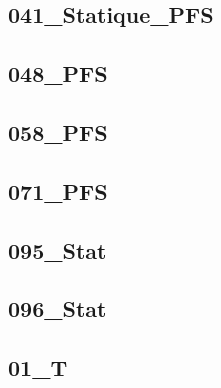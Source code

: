 \subsection{041\_Statique\_PFS}
\graphicspath{{../11-Actions Mécaniques/TD/STAT/041_Statique_PFS/images/}{../11-Actions Mécaniques/TD/STAT/041_Statique_PFS/}{../Style/png/}}


\subsection{048\_PFS}
\graphicspath{{../11-Actions Mécaniques/TD/STAT/048_PFS/images/}{../11-Actions Mécaniques/TD/STAT/048_PFS/}{../Style/png/}}


\subsection{058\_PFS}
\graphicspath{{../11-Actions Mécaniques/TD/STAT/058_PFS/images/}{../11-Actions Mécaniques/TD/STAT/058_PFS/}{../Style/png/}}


\subsection{071\_PFS}
\graphicspath{{../11-Actions Mécaniques/TD/STAT/071_PFS/images/}{../11-Actions Mécaniques/TD/STAT/071_PFS/}{../Style/png/}}


\subsection{095\_Stat}
\graphicspath{{../11-Actions Mécaniques/TD/STAT/095_Stat/images/}{../11-Actions Mécaniques/TD/STAT/095_Stat/}{../Style/png/}}


\subsection{096\_Stat}
\graphicspath{{../11-Actions Mécaniques/TD/STAT/096_Stat/images/}{../11-Actions Mécaniques/TD/STAT/096_Stat/}{../Style/png/}}


\subsection{01\_T}
\graphicspath{{../11-Actions Mécaniques/TD/STAT/Demarche/01_T/images/}{../11-Actions Mécaniques/TD/STAT/Demarche/01_T/}{../Style/png/}}


